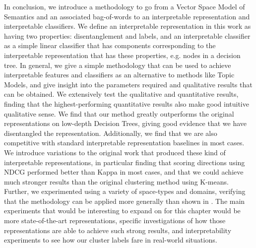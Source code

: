 In conclusion, we introduce a methodology to go from a Vector Space Model of Semantics and an associated bag-of-words to an interpretable representation and interpretable classifiers. We define an interpretable representation in this work as having two properties: disentanglement and labels, and an interpretable classifier as a simple linear classifier that has components corresponding to the interpretable representation that has these properties, e.g. nodes in a decision tree. In general, we give a simple methodology that can be used to achieve interpretable features and classifiers as an alternative to methods like Topic Models, and give insight into the parameters required and qualitative results that can be obtained. We extensively test the qualitative and quantitative results, finding that the highest-performing quantitative results also make good intuitive qualitative sense. We find that our method greatly outperforms the original representations on low-depth Decision Trees, giving good evidence that we have disentangled the representation. Additionally, we find that we are also competitive with standard interpretable representation baselines in most cases. We introduce variations to the original work that produced these kind of interpretable representations, in particular finding that scoring directions using NDCG performed better than Kappa in most cases, and that we could achieve much stronger results than the original clustering method using K-means. Further, we experimented using a variety of space-types and domains, verifying that the methodology can be applied more generally than shown in \cite{Derrac2015}. The main experiments that would be interesting to expand on for this chapter would be more state-of-the-art representations, specific investigations of how those representations are able to achieve such strong results, and interpretability experiments to see how our cluster labels fare in real-world situations.
